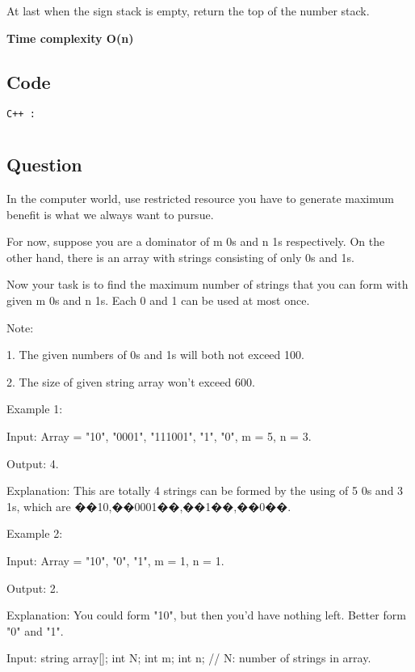 At last when the sign stack is empty, return the top of the number stack.

\textbf{\color{red}Time complexity O(n)}
\subsection{Code}
\texttt{C++ :}


\newpage
\section{}
\subsection{Question}
In the computer world, use restricted resource you have to generate maximum benefit is what we always want to pursue.

For now, suppose you are a dominator of m 0s and n 1s respectively. On the other hand, there is an array with strings consisting of only 0s and 1s.

Now your task is to find the maximum number of strings that you can form with given m 0s and n 1s. Each 0 and 1 can be used at most once.

Note:

1. The given numbers of 0s and 1s will both not exceed 100.

2. The size of given string array won't exceed 600.

Example 1:

Input: Array = {"10", "0001", "111001", "1", "0"}, m = 5, n = 3.

Output: 4.

Explanation: This are totally 4 strings can be formed by the using of 5 0s and 3 1s, which are ��10,��0001��,��1��,��0��.

Example 2:

Input: Array = {"10", "0", "1"}, m = 1, n = 1.

Output: 2.

Explanation: You could form "10", but then you'd have nothing left. Better form "0" and "1".

Input: string array[]; int N; int m; int n; // N: number of strings in array.

